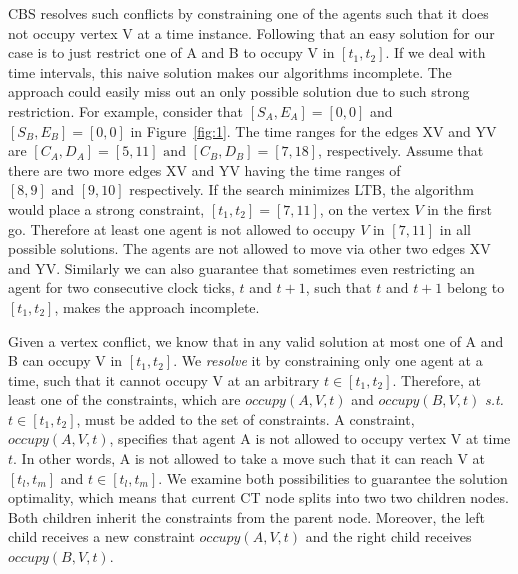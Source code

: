 \documentclass{article}
\begin{document}
CBS resolves such conflicts by constraining one of the agents such that it does not occupy vertex V at a time instance. 
Following that an easy solution for our case is to just restrict one of A and B to occupy V in $[t_1,t_2]$.
If we deal with time intervals, this naive solution makes our algorithms incomplete. The approach could easily miss out an only possible solution due to such strong restriction. 
For example, consider that $[S_A,E_A] = [0,0]$ and $[S_B,E_B] = [0,0]$ in Figure~\ref{fig:1}. The time ranges for the edges XV and YV are $[C_A,D_A] = [5,11] \text{ and } [C_B,D_B] = [7,18]$, respectively.
Assume that there are two more edges XV and YV having the time ranges of $[8,9] \text{ and } [9,10]$ respectively. If the search minimizes 
LTB, the algorithm would place a strong constraint, $[t_1,t_2] = [7,11]$, on the vertex $V$ in the first go. 
Therefore at least one agent is not allowed to occupy $V$ in $[7,11]$ in all possible solutions.
The agents are not allowed to move via other two edges XV and YV.
Similarly we can also guarantee that sometimes even restricting an agent for two consecutive  clock ticks, $t$ and $t+1$, such that $t$ and $t+1$ belong to $[t_1,t_2]$, makes the approach incomplete.   

Given a vertex conflict, we know that in any valid solution at most one of A and B can occupy V in $[t_1,t_2]$.
We \emph{resolve} it by constraining only one agent at a time, such that it cannot occupy V at an arbitrary $t \in [t_1,t_2]$. Therefore, at least one of the constraints, which are $occupy(A,V,t)$ and $occupy(B,V,t)$ \emph{s.t.} $t \in [t_1,t_2]$, must be added to the set of constraints. 
A constraint, $occupy(A,V,t)$, specifies that agent A is not allowed to occupy vertex V at time $t$. In other words, A is not allowed to take a move such that it can reach V at $[t_l,t_m]$ and $t \in [t_l,t_m]$. 
We examine both possibilities to guarantee the solution optimality, which means that current CT node splits into two two children nodes. 
Both children inherit the constraints from the parent node. 
Moreover, the left child receives a new constraint $occupy(A,V,t)$ and the right child receives $occupy(B,V,t)$.         
\end{document}
